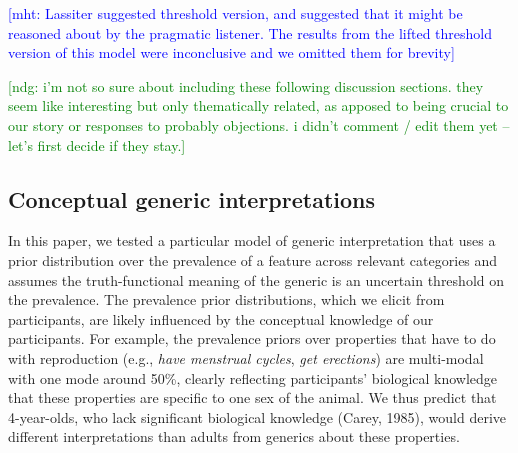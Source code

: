 \documentclass[floatsintext,doc]{apa6}
\newcommand{\mht}[1]{{\textcolor{Blue}{[mht: #1]}}}
\begin{document}
\mht{Lassiter suggested threshold version, and suggested that it might be reasoned about by the pragmatic listener. The results from the lifted threshold version of this model were inconclusive and we omitted them for brevity}






%
{\textcolor{Green}{[ndg: i'm not so sure about including these following discussion sections. they seem like interesting but only thematically related, as apposed to being crucial to our story or responses to probably objections. i didn't comment / edit them yet -- let's first decide if they stay.]}}


\hypertarget{conceptual-generic-interpretations}{%
\subsection{Conceptual generic interpretations}\label{conceptual-generic-interpretations}}

In this paper, we tested a particular model of generic interpretation that uses a prior distribution over the prevalence of a feature across relevant categories and assumes the truth-functional meaning of the generic is an uncertain threshold on the prevalence.
The prevalence prior distributions, which we elicit from participants, are likely influenced by the conceptual knowledge of our participants.
For example, the prevalence priors over properties that have to do with reproduction (e.g., \emph{have menstrual cycles}, \emph{get erections}) are multi-modal with one mode around 50\%, clearly reflecting participants' biological knowledge that these properties are specific to one sex of the animal.
We thus predict that 4-year-olds, who lack significant biological knowledge (Carey, 1985), would derive different interpretations than adults from generics about these properties.
\end{document}
